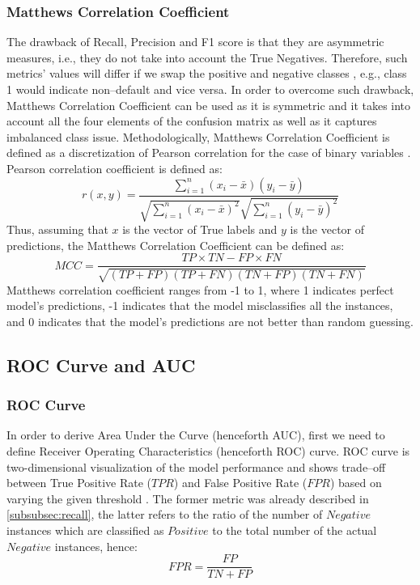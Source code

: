 \subsubsection{Matthews Correlation Coefficient}
The drawback of Recall, Precision and F1 score is that they are asymmetric measures, i.e., they do not take into account the True Negatives.
Therefore, such metrics' values will differ if we swap the positive and negative classes \citep{chicco2020advantages}, e.g., class 1 would indicate non--default and vice versa.
In order to overcome such drawback, Matthews Correlation Coefficient can be used as it is symmetric and it takes into account all the four elements of the confusion matrix as well as it captures imbalanced class issue.
Methodologically, Matthews Correlation Coefficient is defined as a discretization of Pearson correlation for the case of binary variables \citep{boughorbel2017optimal}.
Pearson correlation coefficient is defined as:
\begin{equation}\label{eq}
    r(x,y) = \frac{\sum\limits_{i=1}^n (x_i - \bar{x})(y_i - \bar{y})}{\sqrt{\sum\limits_{i=1}^n (x_i - \bar{x})^2} \sqrt{\sum\limits_{i=1}^n (y_i - \bar{y})^2}}
\end{equation}
Thus, assuming that $x$ is the vector of True labels and $y$ is the vector of predictions, the Matthews Correlation Coefficient can be defined as:
\begin{equation}\label{eq}
    MCC = \frac{TP \times TN - FP \times FN}{\sqrt{(TP + FP) (TP + FN) (TN + FP) (TN + FN)}}
\end{equation}
Matthews correlation coefficient ranges from -1 to 1, where 1 indicates perfect model's predictions, -1 indicates that the model misclassifies all the instances, and 0 indicates that the model's predictions are not better than random guessing.

\newpage
\subsection{ROC Curve and AUC}
\subsubsection{ROC Curve}
In order to derive Area Under the Curve (henceforth AUC), first we need to define Receiver Operating Characteristics (henceforth ROC) curve.
ROC curve is two-dimensional visualization of the model performance and shows trade--off between True Positive Rate ($TPR$) and False Positive Rate ($FPR$) based on varying the given threshold \citep{han2011data}. The former metric was already described in \autoref{subsubsec:recall}, the latter refers to the ratio of the number of $Negative$ instances which are classified as $Positive$ to the total number of the actual $Negative$ instances, hence:
\begin{equation}\label{eq}
    FPR = \frac{FP}{TN + FP}
\end{equation}

